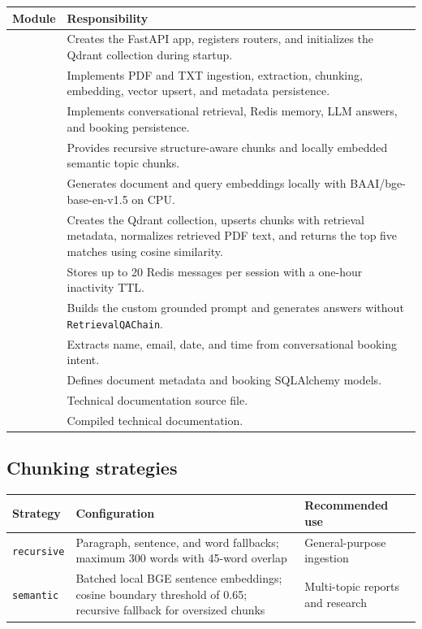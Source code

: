 \documentclass[12pt, a4paper]{article}
\begin{document}
\begin{tabularx}{\textwidth}{L{4.7cm} Y}
    \toprule
    \textbf{Module} & \textbf{Responsibility} \\
    \midrule
     & Creates the FastAPI app, registers routers, and
    initializes the Qdrant collection during startup. \\
     & Implements PDF and TXT ingestion, extraction,
    chunking, embedding, vector upsert, and metadata persistence. \\
     & Implements conversational retrieval, Redis
    memory, LLM answers, and booking persistence. \\
     & Provides recursive structure-aware chunks
    and locally embedded semantic topic chunks. \\
     & Generates document and query
    embeddings locally with BAAI/bge-base-en-v1.5 on CPU. \\
     & Creates the Qdrant collection,
    upserts chunks with retrieval metadata, normalizes retrieved PDF text, and
    returns the top five matches using cosine similarity. \\
     & Stores up to 20 Redis messages per
    session with a one-hour inactivity TTL. \\
     & Builds the custom grounded prompt and
    generates answers without \texttt{RetrievalQAChain}. \\
     & Extracts name, email, date, and time
    from conversational booking intent. \\
     & Defines document metadata and booking
    SQLAlchemy models. \\
     & Technical documentation source file. \\
     & Compiled technical documentation. \\
    \bottomrule
\end{tabularx}

\subsection{Chunking strategies}

\begin{tabularx}{\textwidth}{L{2.5cm} L{5cm} Y}
    \toprule
    \textbf{Strategy} & \textbf{Configuration} & \textbf{Recommended use} \\
    \midrule
    \texttt{recursive} & Paragraph, sentence, and word fallbacks; maximum 300
    words with 45-word overlap & General-purpose ingestion \\
    \texttt{semantic} & Batched local BGE sentence embeddings; cosine boundary
    threshold of 0.65; recursive fallback for oversized chunks & Multi-topic
    reports and research \\
    \bottomrule
\end{tabularx}
\end{document}
